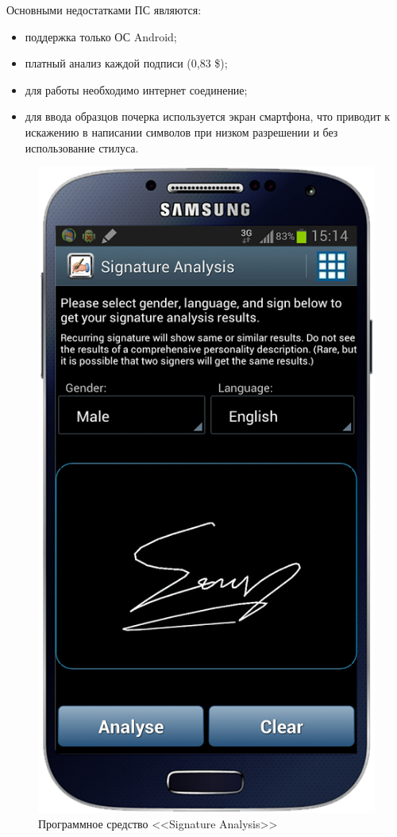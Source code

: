 Основными недостатками ПС являются:
\begin{itemize}
  \item поддержка только ОС Android;
  \item платный анализ каждой подписи (0,83 \$);
  \item для работы необходимо интернет соединение;
  \item для ввода образцов почерка используется экран смартфона, что приводит к искажению в написании символов при низком разрешении и без использование стилуса.
\end{itemize}

\begin{figure}[ht]{}
    \centering
    \includegraphics[height=0.4\textheight]{figures/analog_signature_analysis.png}
    \caption{Программное средство <<Signature Analysis>>}
    \label{fig:domain:analogs:signature_analysis}
\end{figure}


